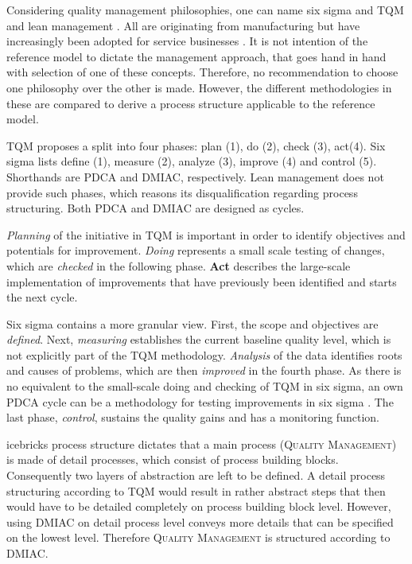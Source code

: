 	Considering quality management philosophies, one can name six sigma and \acrshort{TQM} and lean management \citep{Andersson_2006}. All are originating from manufacturing but have increasingly been adopted for service businesses \citep{Antony_2007}. It is not intention of the reference model to dictate the management approach, that goes hand in hand with selection of one of these concepts. Therefore, no recommendation to choose one philosophy over the other is made. However, the different methodologies in these are compared to derive a process structure applicable to the reference model. 
	
	\acrshort{TQM} proposes a split into four phases: plan (1), do (2), check (3), act(4). Six sigma lists define (1), measure (2), analyze (3), improve (4) and control (5). Shorthands are \acrshort{PDCA} and \acrshort{DMIAC}, respectively. Lean management does not provide such phases, which reasons its disqualification regarding process structuring. Both \acrshort{PDCA} and \acrshort{DMIAC} are designed as cycles. 
	
	\textit{Planning} of the initiative in \acrshort{TQM} is important in order to identify objectives and potentials for improvement. \textit{Doing} represents a small scale testing of changes, which are \textit{checked} in the following phase. \textbf{Act} describes the large-scale implementation of improvements that have previously been identified and starts the next cycle. 
	
	Six sigma contains a more granular view. First, the scope and objectives are \textit{defined}. Next, \textit{measuring} establishes the current baseline quality level, which is not explicitly part of the \acrshort{TQM} methodology. \textit{Analysis} of the data identifies roots and causes of problems, which are then \textit{improved} in the fourth phase. As there is no equivalent to the small-scale doing and checking of \acrshort{TQM} in six sigma, an own \acrshort{PDCA} cycle can be a methodology for testing improvements in six sigma \citep{9780071840538}. The last phase, \textit{control}, sustains the quality gains and has a monitoring function.
	
	icebricks process structure dictates that a main process (\textsc{Quality Management}) is made of detail processes, which consist of process building blocks. Consequently two layers of abstraction are left to be defined. A detail process structuring according to \acrshort{TQM} would result in rather abstract steps that then would have to be detailed completely on process building block level. However, using \acrshort{DMIAC} on detail process level conveys more details that can be specified on the lowest level. Therefore \textsc{Quality Management} is structured according to \acrshort{DMIAC}. 
	
